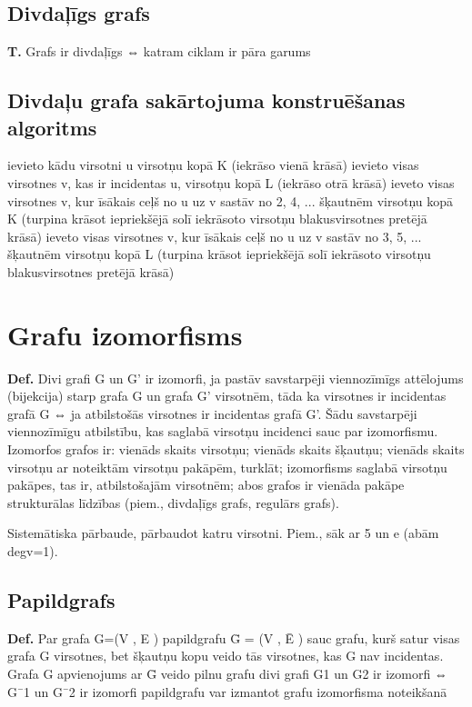 \documentclass{article}
\begin{document}
\subsection{Divdaļīgs grafs}

\textbf{T.}  Grafs ir divdaļīgs ⇔ katram ciklam ir pāra garums

\subsection{Divdaļu grafa sakārtojuma konstruēšanas algoritms}
ievieto kādu virsotni u virsotņu kopā K (iekrāso vienā krāsā)
ievieto visas virsotnes v, kas ir incidentas u, virsotņu kopā L (iekrāso
otrā krāsā)
ieveto visas virsotnes v, kur īsākais ceļš no u uz v sastāv no 2, 4, ...  šķautnēm virsotņu kopā K (turpina krāsot iepriekšējā solī iekrāsoto virsotņu blakusvirsotnes pretējā krāsā)
ieveto visas virsotnes v, kur īsākais ceļš no u uz v sastāv no 3, 5, ...
šķautnēm virsotņu kopā L (turpina krāsot iepriekšējā solī iekrāsoto virsotņu blakusvirsotnes pretējā krāsā)


\section{Grafu izomorfisms}

\textbf{Def.}  Divi grafi G un G' ir izomorfi, ja pastāv savstarpēji viennozīmīgs attēlojums (bijekcija) starp grafa G un grafa G' virsotnēm, tāda ka virsotnes ir incidentas grafā G ⇔ ja atbilstošās virsotnes ir incidentas grafā G'.
Šādu savstarpēji viennozīmīgu atbilstību, kas saglabā virsotņu incidenci sauc par izomorfismu.  Izomorfos grafos ir: vienāds skaits virsotņu; vienāds skaits šķautņu; vienāds skaits virsotņu ar noteiktām virsotņu pakāpēm, turklāt; izomorfisms saglabā virsotņu pakāpes, tas ir, atbilstošajām virsotnēm; abos grafos ir vienāda pakāpe strukturālas līdzības (piem., divdaļīgs grafs, regulārs grafs).

Sistemātiska pārbaude, pārbaudot katru virsotni. Piem., sāk ar 5 un e (abām degv=1).

\subsection{Papildgrafs}

\textbf{Def.}  Par grafa G=(V , E ) papildgrafu Ḡ = (V , Ē ) sauc grafu, kurš satur visas grafa G virsotnes, bet šķautņu kopu veido tās virsotnes, kas G nav incidentas.  Grafa G apvienojums ar Ḡ veido pilnu grafu divi grafi G1 un G2 ir izomorfi ⇔ G¯1 un G¯2 ir izomorfi papildgrafu var izmantot grafu izomorfisma noteikšanā
\end{document}
